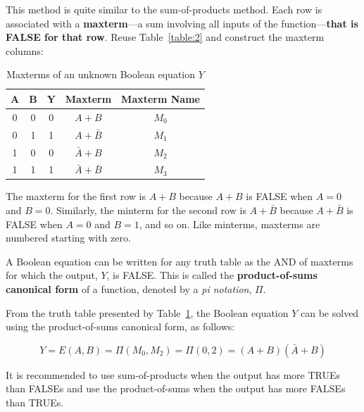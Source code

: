 \documentclass[12pt]{article}
\begin{document}
\begin{enumerate}
  This method is quite similar to the sum-of-products method. Each row is associated with a \textbf{maxterm}---a sum involving all inputs of the function---\textbf{that is FALSE for that row}. Reuse Table~\ref{table:2} and construct the maxterm columns:

  \begin{table}[ht]
    \centering
    \begin{tabular}{ | c | c | c | c | c | }
    \hline \rule{0em}{1em}
    $\mathbf{A}$ & $\mathbf{B}$ & $\mathbf{Y}$ & \textbf{Maxterm}    & \textbf{Maxterm Name} \\ \hline \rule{0em}{1em}
    0            & 0            & 0            & $A + B$             & $M_0$                 \\ \hline \rule{0em}{1em}
    0            & 1            & 1            & $A + \bar{B}$       & $M_1$                 \\ \hline \rule{0em}{1em}
    1            & 0            & 0            & $\bar{A} + B$       & $M_2$                 \\ \hline \rule{0em}{1em}
    1            & 1            & 1            & $\bar{A} + \bar{B}$ & $M_3$                 \\ \hline
    \end{tabular}
    \caption{Maxterms of an unknown Boolean equation $Y$}
    \label{table:3}
  \end{table}

  The maxterm for the first row is $A + B$ because $A + B$ is FALSE when $A = 0$ and $B = 0$. Similarly, the minterm for the second row is $A + \bar{B}$ because $A + \bar{B}$ is FALSE when $A = 0$ and $B = 1$, and so on. Like minterms, maxterms are numbered starting with zero.

  A Boolean equation can be written for any truth table as the AND of maxterms for which the output, $Y$, is FALSE. This is called the \textbf{product-of-sums canonical form} of a function, denoted by a \textit{pi notation}, $\Pi$.

  From the truth table presented by Table~\ref{table:3}, the Boolean equation $Y$ can be solved using the product-of-sums canonical form, as follows:

  \begin{equation} \label{equation:4}
    Y = E(A, B) = \Pi(M_0, M_2) = \Pi(0, 2) = (A + B)(\bar{A} + B)
  \end{equation}

  It is recommended to use sum-of-products when the output has more TRUEs than FALSEs and use the product-of-sums when the output has more FALSEs than TRUEs.
\end{enumerate}
\end{document}
